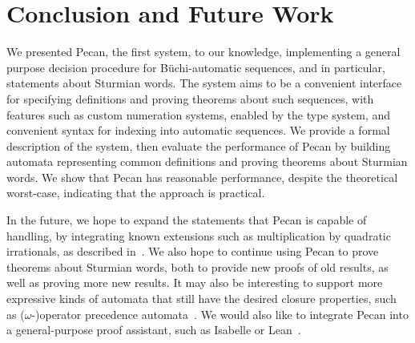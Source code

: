 \section{Conclusion and Future Work}\label{sec:conclusion}

We presented Pecan, the first system, to our knowledge, implementing a general purpose decision procedure for B\"uchi-automatic sequences, and in particular, statements about Sturmian words.
The system aims to be a convenient interface for specifying definitions and proving theorems about such sequences, with features such as custom numeration systems, enabled by the type system, and convenient syntax for indexing into automatic sequences.
We provide a formal description of the system, then evaluate the performance of Pecan by building automata representing common definitions and proving theorems about Sturmian words.
We show that Pecan has reasonable performance, despite the theoretical worst-case, indicating that the approach is practical.

In the future, we hope to expand the statements that Pecan is capable of handling, by integrating known extensions such as multiplication by quadratic irrationals, as described in~\cite{hieronymi2019presburger}.
We also hope to continue using Pecan to prove theorems about Sturmian words, both to provide new proofs of old results, as well as proving more new results.
It may also be interesting to support more expressive kinds of automata that still have the desired closure properties, such as ($\omega$-)operator precedence automata~\cite{panella2013operator}.
We would also like to integrate Pecan into a general-purpose proof assistant, such as Isabelle or Lean~\cite{de2015lean}. %
